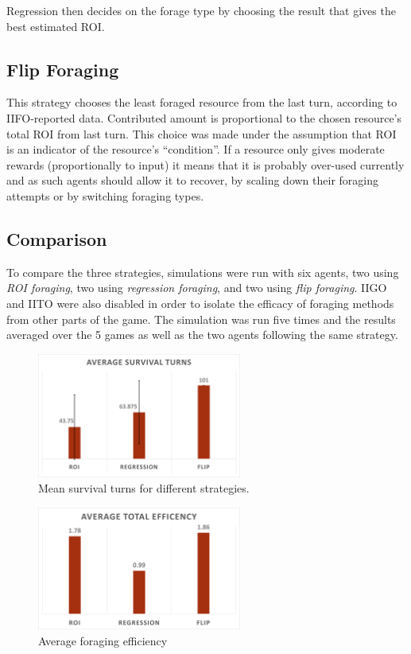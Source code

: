 Regression then decides on the forage type by choosing the result that gives the best estimated ROI.

\subsection{Flip Foraging}

This strategy chooses the least foraged resource from the last turn, according to IIFO-reported data. Contributed amount is proportional to the chosen resource's total ROI from last turn. This choice was made under the assumption that ROI is an indicator of the resource's ``condition''. If a resource only gives moderate rewards (proportionally to input) it means that it is probably over-used currently and as such agents should allow it to recover, by scaling down their foraging attempts or by switching foraging types.

\subsection{Comparison}

To compare the three strategies, simulations were run with six agents, two using \emph{ROI foraging}, two using \emph{regression foraging}, and two using \emph{flip foraging}. IIGO and IITO were also disabled in order to isolate the efficacy of foraging methods from other parts of the game. The simulation was run five times and the results averaged over the 5 games as well as the two agents following the same strategy.

\begin{figure}[H] 
\centering
\includegraphics[width=0.6\textwidth]{09_team1_agentdesign/images/mean_survival_turns}
\caption{Mean survival turns for different strategies.}
\label{fig:team1:mean_survival}
\end{figure} 

\begin{figure}[H] 
\centering
\includegraphics[width=0.6\textwidth]{09_team1_agentdesign/images/total_efficiency}
\caption{Average foraging efficiency}
\label{fig:team1:average_efficiency}
\end{figure} 

